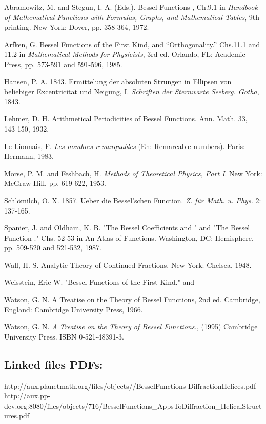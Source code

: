\documentclass[12pt]{article}
\theoremstyle{plain}
\theoremstyle{definition}
\numberwithin{equation}{section}
\begin{document}
\begin{thebibliography}{99}
Abramowitz, M. and Stegun, I. A. (Eds.). Bessel Functions , Ch.9.1 in {\em Handbook of Mathematical Functions with Formulas, Graphs, and Mathematical Tables}, 9th printing. New York: Dover, pp. 358-364, 1972. 

Arfken, G. Bessel Functions of the First Kind, and ``Orthogonality.'' Chs.11.1 and 11.2 in {\em Mathematical Methods for Physicists}, 3rd ed. Orlando, FL: Academic Press, pp. 573-591 and 591-596, 1985.

Hansen, P. A. 1843. Ermittelung der absoluten Strungen in Ellipsen von beliebiger Excentricitat und Neigung, I. {\em Schriften der Sternwarte Seeberg. Gotha}, 1843. 

Lehmer, D. H. Arithmetical Periodicities of Bessel Functions. Ann. Math. 33, 143-150, 1932. 

Le Lionnais, F. {\em Les nombres remarquables} (En: Remarcable numbers). Paris: Hermann, 1983. 

Morse, P. M. and Feshbach, H. {\em Methods of Theoretical Physics, Part I}. New York: McGraw-Hill, pp. 619-622, 1953. 

Schl\"omilch, O. X.  1857. Ueber die Bessel'schen Function. {\em Z. f\"ur Math. u. Phys.} 2: 137-165. 

Spanier, J. and Oldham, K. B. "The Bessel Coefficients  and " and "The Bessel Function ." Chs. 52-53 in An Atlas of Functions. Washington, DC: Hemisphere, pp. 509-520 and 521-532, 1987. 

Wall, H. S. Analytic Theory of Continued Fractions. New York: Chelsea, 1948. 

Weisstein, Eric W. "Bessel Functions of the First Kind." 
 and

Watson, G. N. A Treatise on the Theory of Bessel Functions, 2nd ed. Cambridge, England: Cambridge University Press, 1966.

Watson, G. N. {\em A Treatise on the Theory of Bessel Functions.}, (1995) Cambridge University Press. ISBN 0-521-48391-3.


\end{thebibliography}

\subsection{Linked files PDFs:}

http://aux.planetmath.org/files/objects//BesselFunctions-DiffractionHelices.pdf
http://aux.pp-dev.org:8080/files/objects/716/BesselFunctions_AppsToDiffraction_HelicalStructures.pdf

\end{document}
